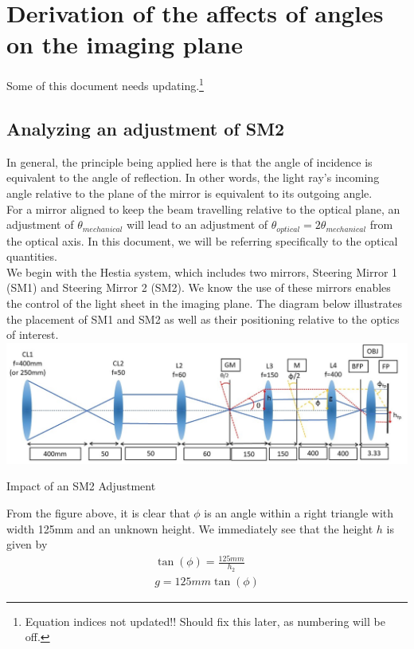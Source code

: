 \section{Derivation of the affects of angles on the imaging plane}
Some of this document needs updating.\footnote{Equation indices not updated!! Should fix this later, as numbering will be off.}

\subsection{Analyzing an adjustment of SM2}
In general, the principle being applied here is that the angle of incidence is equivalent to the angle of reflection. In other words, the light ray's incoming angle relative to the plane of the mirror is equivalent to its outgoing angle.\\
For a mirror aligned to keep the beam travelling relative to the optical plane, an adjustment of $\theta_{mechanical}$ will lead to an adjustment of $\theta_{optical} = 2\theta_{mechanical}$ from the optical axis. In this document, we will be referring specifically to the optical quantities. \\
We begin with the Hestia system, which includes two mirrors, Steering Mirror 1 (SM1) and Steering Mirror 2 (SM2). We know the use of these mirrors enables the control of the light sheet in the imaging plane. The diagram below illustrates the placement of SM1 and SM2 as well as their positioning relative to the optics of interest.\\
\includegraphics[width=\textwidth]{Hestia_HIST_Computation_Fig1}
\begin{center}
    Impact of an SM2 Adjustment
\end{center}
From the figure above, it is clear that $\phi$ is an angle within a right triangle with width 125mm and an unknown height. We immediately see that the height $h$ is given by
\begin{gather}
    \tan(\phi)=\frac{125mm}{h_2}\\
    g = 125mm \tan(\phi)
\end{gather}
